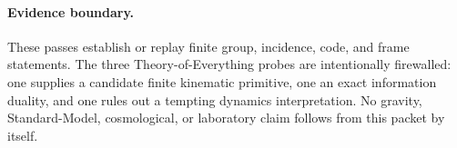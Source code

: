 \paragraph{Evidence boundary.}
These passes establish or replay finite group, incidence, code, and frame
statements.  The three Theory-of-Everything probes are intentionally
firewalled: one supplies a candidate finite kinematic primitive, one an exact
information duality, and one rules out a tempting dynamics interpretation.
No gravity, Standard-Model, cosmological, or laboratory claim follows from
this packet by itself.
